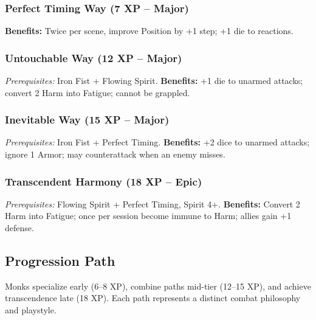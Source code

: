 \subsubsection{Perfect Timing Way (7 XP -- Major)}\label{talent:perfect_timing_way}
\textbf{Benefits:} Twice per scene, improve Position by +1 step; +1 die to reactions.

\subsubsection{Untouchable Way (12 XP -- Major)}\label{talent:untouchable_way}
\textit{Prerequisites:} Iron Fist + Flowing Spirit.
\textbf{Benefits:} +1 die to unarmed attacks; convert 2 Harm into Fatigue; cannot be grappled.

\subsubsection{Inevitable Way (15 XP -- Major)}\label{talent:inevitable_way}
\textit{Prerequisites:} Iron Fist + Perfect Timing.
\textbf{Benefits:} +2 dice to unarmed attacks; ignore 1 Armor; may counterattack when an enemy misses.

\subsubsection{Transcendent Harmony (18 XP -- Epic)}\label{talent:transcendent_harmony}
\textit{Prerequisites:} Flowing Spirit + Perfect Timing, Spirit 4+.
\textbf{Benefits:} Convert 2 Harm into Fatigue; once per session become immune to Harm; allies gain +1 defense.

\subsection{Progression Path}
Monks specialize early (6--8 XP), combine paths mid-tier (12--15 XP), and achieve transcendence late (18 XP). Each path represents a distinct combat philosophy and playstyle.

